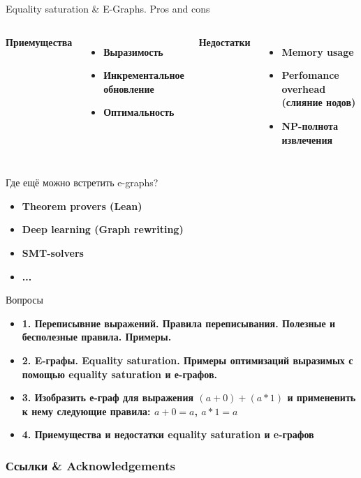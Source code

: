 \documentclass[aspectratio=169
  , xcolor={svgnames}
  , russian  %
  ]{beamer}
\begin{document}
\begin{frame}{Equality saturation \& E-Graphs. Pros and cons}
    \begin{columns}
        \textbf{Приемущества}
        \begin{itemize}
            \item \textbf{Выразимость}
            \item \textbf{Инкрементальное обновление}
            \item \textbf{Оптимальность}
        \end{itemize}

        \textbf{Недостатки}
        \begin{itemize}
            \item \textbf{Memory usage}
            \item \textbf{Perfomance overhead (слияние нодов)}
            \item \textbf{NP-полнота извлечения}
        \end{itemize}
    \end{columns}
\end{frame}

\begin{frame}{Где ещё можно встретить e-graphs?}
    \begin{itemize}
    \item \textbf{\fontsize{14.1}{12} Theorem provers (Lean) \cite{Lean}}
    \newline
    \item \textbf{\fontsize{14.1}{12} Deep learning (Graph rewriting)\cite{Deep_learning}}
    \newline
    \item \textbf{\fontsize{14.1}{12} SMT-solvers\cite{CMT} }
    \newline 
    \item \textbf{\fontsize{14.1}{12} ... }
    \end{itemize}
\end{frame}

\begin{frame}{Вопросы}
    \begin{itemize}
    \item \textbf{\fontsize{14.1}{12} 1. Переписывние выражений. Правила переписывания. Полезные и бесполезные правила. Примеры. }
    \newline
    \item \textbf{\fontsize{14.1}{12} 
2. E-графы. Equality saturation. Примеры оптимизаций выразимых с помощью equality saturation и е-графов.}
    \newline
    \item \textbf{\fontsize{14.1}{12} 3. Изобразить е-граф для выражения $(a + 0) + (a * 1)$ и примененить к нему следующие правила: $a + 0 = a$, $a * 1 = a$ }
    \newline 
    \item \textbf{\fontsize{14.1}{12} 4. Приемущества и недостатки equality saturation и e-графов
 }
    \end{itemize}
\end{frame}

\begin{frame}%
\frametitle<presentation>{Ссылки \& Acknowledgements}
\vspace{-1em}
\printbibliography
\end{frame}
\end{document}
